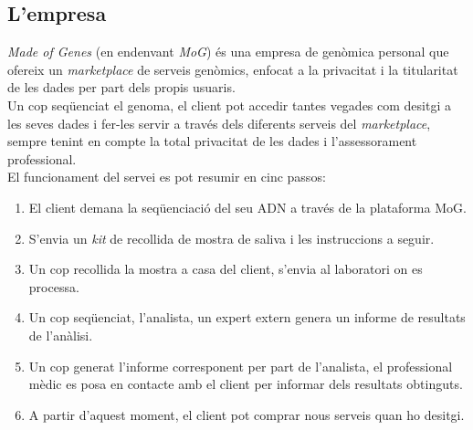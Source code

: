 \subsection{L'empresa}
\label{context:empresa}
\textit{Made of Genes} (en endenvant \textit{MoG}) és una empresa de genòmica personal que ofereix un \textit{marketplace} de serveis genòmics, enfocat a la privacitat i la titularitat de les dades per part dels propis usuaris.\\
\newline Un cop seqüenciat el genoma, el client pot accedir tantes vegades com desitgi a les seves dades i fer-les servir a través dels diferents serveis del \textit{marketplace}, sempre tenint en compte la total privacitat de les dades i l’assessorament professional.\\
\newline El funcionament del servei es pot resumir en cinc passos:
\begin{enumerate}
    \item El client demana la seqüenciació del seu ADN a través de la plataforma MoG.
    \item S’envia un \textit{kit} de recollida de mostra de saliva i les instruccions a seguir.
    \item Un cop recollida la mostra a casa del client, s’envia al laboratori on es processa.
    \item Un cop seqüenciat, l'analista, un expert extern genera un informe de resultats de l'anàlisi.
    \item Un cop generat l'informe corresponent per part de l'analista, el professional mèdic es posa en contacte amb el client per informar dels resultats obtinguts.
    \item A partir d’aquest moment, el client pot comprar nous serveis quan ho desitgi.
\end{enumerate}
